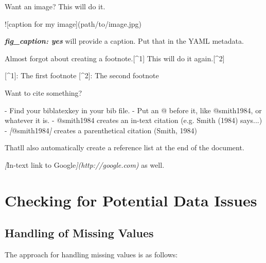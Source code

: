 \documentclass[
  11pt,
]{article}
\newenvironment{Shaded}{\begin{snugshade}}{\end{snugshade}}
\newcommand{\AlertTok}[1]{\textcolor[rgb]{0.94,0.16,0.16}{#1}}
\newcommand{\CommentTok}[1]{\textcolor[rgb]{0.56,0.35,0.01}{\textit{#1}}}
\newcommand{\InformationTok}[1]{\textcolor[rgb]{0.56,0.35,0.01}{\textbf{\textit{#1}}}}
\newcommand{\NormalTok}[1]{#1}
\newcommand{\OtherTok}[1]{\textcolor[rgb]{0.56,0.35,0.01}{#1}}
\newcommand{\SpecialStringTok}[1]{\textcolor[rgb]{0.31,0.60,0.02}{#1}}
\begin{document}
\begin{Shaded}
\begin{Highlighting}[]
\NormalTok{Want an image? This will do it.}

\AlertTok{![caption for my image](path/to/image.jpg)}

\InformationTok{\textasciigrave{}fig\_caption: yes\textasciigrave{}}\NormalTok{ will provide a caption. Put that in the YAML metadata.}

\NormalTok{Almost forgot about creating a footnote.}\OtherTok{[\^{}1]}\NormalTok{ This will do it again.}\OtherTok{[\^{}2]}

\OtherTok{[\^{}1]: }\NormalTok{The first footnote}
\OtherTok{[\^{}2]: }\NormalTok{The second footnote}

\NormalTok{Want to cite something? }

\SpecialStringTok{{-} }\NormalTok{Find your biblatexkey in your bib file.}
\SpecialStringTok{{-} }\NormalTok{Put an @ before it, like @smith1984, or whatever it is.}
\SpecialStringTok{{-} }\NormalTok{@smith1984 creates an in{-}text citation (e.g. Smith (1984) says...)}
\SpecialStringTok{{-} }\CommentTok{[}\OtherTok{@smith1984}\CommentTok{]}\NormalTok{ creates a parenthetical citation (Smith, 1984)}

\NormalTok{That\textquotesingle{}ll also automatically create a reference list at the end of the document.}

\CommentTok{[}\OtherTok{In{-}text link to Google}\CommentTok{](http://google.com)}\NormalTok{ as well.}
\end{Highlighting}
\end{Shaded}

\hypertarget{checking-for-potential-data-issues}{%
\section{Checking for Potential Data
Issues}\label{checking-for-potential-data-issues}}

\hypertarget{handling-of-missing-values}{%
\subsection{Handling of Missing
Values}\label{handling-of-missing-values}}

The approach for handling missing values is as follows:
\end{document}
